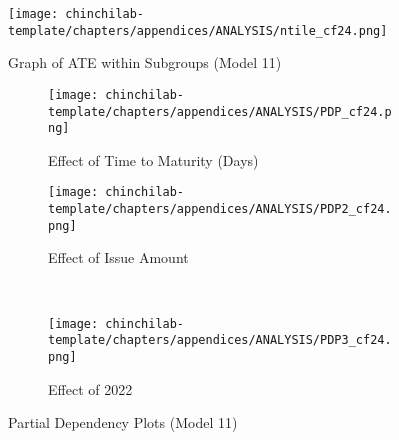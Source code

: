 \begin{figure}[h!]
    \centering
    \texttt{[image: chinchilab-template/chapters/appendices/ANALYSIS/ntile\_cf24.png]}
    \caption{Graph of ATE within Subgroups (Model 11)}
    \label{fig:my_label}
\end{figure}

\begin{figure}[H]
\centering
   \begin{subfigure}[b]{0.45\textwidth}
    \texttt{[image: chinchilab-template/chapters/appendices/ANALYSIS/PDP\_cf24.png]}
    \caption{Effect of Time to Maturity (Days)}
   \label{fig:Ng1} 
\end{subfigure}
\begin{subfigure}[b]{0.45\textwidth}
    \texttt{[image: chinchilab-template/chapters/appendices/ANALYSIS/PDP2\_cf24.png]}
    \caption{Effect of Issue Amount}
   \label{fig:Ng2}
\end{subfigure}
\\
\begin{subfigure}[b]{0.45\textwidth}
    \texttt{[image: chinchilab-template/chapters/appendices/ANALYSIS/PDP3\_cf24.png]}
    \caption{Effect of 2022}
   \label{fig:Ng2}
\end{subfigure}
\caption{Partial Dependency Plots (Model 11)}
\end{figure}



